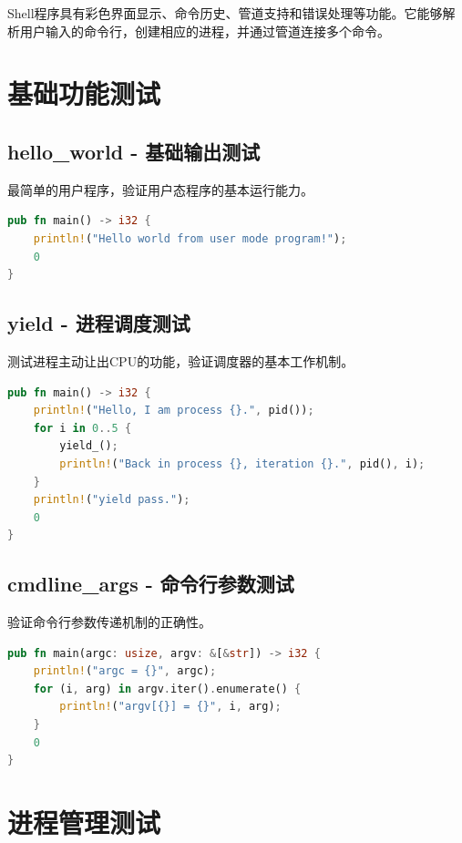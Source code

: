 Shell程序具有彩色界面显示、命令历史、管道支持和错误处理等功能。它能够解析用户输入的命令行，创建相应的进程，并通过管道连接多个命令。

\section{基础功能测试}

\subsection{hello\_world - 基础输出测试}

最简单的用户程序，验证用户态程序的基本运行能力。

\begin{lstlisting}[language=Rust]
pub fn main() -> i32 {
    println!("Hello world from user mode program!");
    0
}
\end{lstlisting}

\subsection{yield - 进程调度测试}

测试进程主动让出CPU的功能，验证调度器的基本工作机制。

\begin{lstlisting}[language=Rust]
pub fn main() -> i32 {
    println!("Hello, I am process {}.", pid());
    for i in 0..5 {
        yield_();
        println!("Back in process {}, iteration {}.", pid(), i);
    }
    println!("yield pass.");
    0
}
\end{lstlisting}

\subsection{cmdline\_args - 命令行参数测试}

验证命令行参数传递机制的正确性。

\begin{lstlisting}[language=Rust]
pub fn main(argc: usize, argv: &[&str]) -> i32 {
    println!("argc = {}", argc);
    for (i, arg) in argv.iter().enumerate() {
        println!("argv[{}] = {}", i, arg);
    }
    0
}
\end{lstlisting}

\section{进程管理测试}

